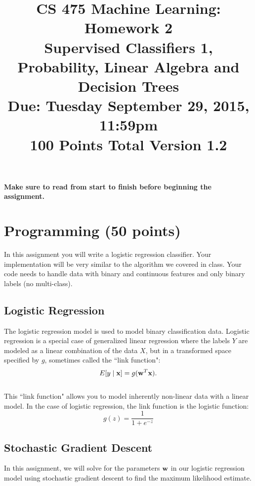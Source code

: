 \documentclass[11pt]{article}
\title{CS 475 Machine Learning: Homework 2\\Supervised Classifiers 1,\\
Probability, Linear Algebra and Decision Trees\\
\Large{Due: Tuesday September 29, 2015, 11:59pm}\\
100 Points Total \hspace{1cm} Version 1.2}
\author{}
\date{}
\newcommand{\vw}{{\bf w}}
\newcommand{\vx}{{\bf x}}
\begin{document}
\large
\maketitle
\thispagestyle{headings}

\vspace{-.5in}

{\bf Make sure to read from start to finish before beginning the assignment.}
\section{Programming (50 points)}
In this assignment you will write a logistic regression classifier. Your implementation will be very similar to
the algorithm we covered in class. Your code needs to handle data with binary and continuous features and only binary labels (no multi-class).

\subsection{Logistic Regression}
The logistic regression model is used to model binary classification data. Logistic regression is a special case of generalized linear regression where the labels $Y$ are modeled as a linear combination of the data $X$, but in a transformed space specified by $g$, sometimes called the ``link function":
\begin{equation}
E[y \mid \vx] = g(\vw^T\vx).
\end{equation}
\\
This ``link function" allows you to model inherently non-linear data with a linear model. In the case of logistic regression, the link function is the logistic function:
\begin{equation}
g(z) = \frac{1}{1 + e^{-z}}
\end{equation}

\subsection{Stochastic Gradient Descent}
In this assignment, we will solve for the parameters $\vw$ in our logistic regression model using stochastic gradient descent to find the maximum likelihood estimate.
\end{document}
